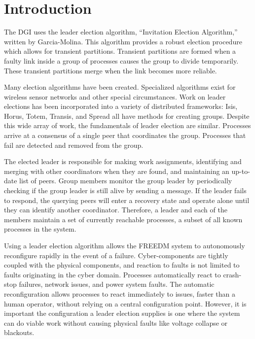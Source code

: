 \section{Introduction}

The DGI uses the leader election algorithm, ``Invitation Election Algorithm,'' written by Garcia-Molina\cite{INVITATIONELECTION}.
This algorithm provides a robust election procedure which allows for transient partitions.
Transient partitions are formed when a faulty link inside a group of processes causes the group to divide temporarily.
These transient partitions merge when the link becomes more reliable.

Many election algorithms have been created.
Specialized algorithms exist for wireless sensor networks\cite{LE-WSN-1}\cite{LE-WSN-2} and other special circumstances\cite{LE-SPECIALCIRCUMSTANCES-1}\cite{LE-SPECIALCIRCUMSTANCES-2}.
Work on leader elections has been incorporated into a variety of distributed frameworks: Isis\cite{ISISTOOLKIT}, Horus\cite{HORUSTOOLKIT}, Totem\cite{TOTEMTOOLKIT}, Transis\cite{TRANSISTOOLKIT}, and Spread\cite{SPREADTOOLKIT} all have methods for creating groups.
Despite this wide array of work, the fundamentals of leader election are similar.
Processes arrive at a consensus of a single peer that coordinates the group.
Processes that fail are detected and removed from the group.

The elected leader is responsible for making work assignments, identifying and merging with other coordinators when they are found, and maintaining an up-to-date list of peers.
Group members monitor the group leader by periodically checking if the group leader is still alive by sending a message.
If the leader fails to respond, the querying peers will enter a recovery state and operate alone until they can identify another coordinator.
Therefore, a leader and each of the members maintain a set of currently reachable processes, a subset of all known processes in the system.

Using a leader election algorithm allows the FREEDM system to autonomously reconfigure rapidly in the event of a failure.
Cyber-components are tightly coupled with the physical components, and reaction to faults is not limited to faults originating in the cyber domain.
Processes automatically react to crash-stop failures, network issues, and power system faults.
The automatic reconfiguration allows processes to react immediately to issues, faster than a human operator, without relying on a central configuration point.
However, it is important the configuration a leader election supplies is one where the system can do viable work without causing physical faults like voltage collapse or blackouts\cite{HARINI}.


